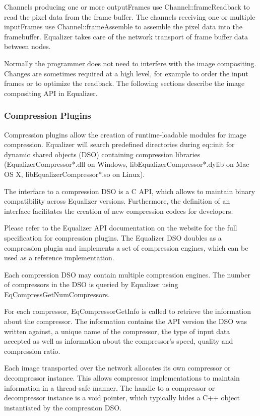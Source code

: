 \documentclass[10pt,a4]{scrartcl}
\begin{document}
Channels producing one or more \textsf{outputFrame}s use
\textsf{Channel::frame\-Read\-back} to read the pixel data from the frame
buffer. The channels receiving one or multiple \textsf{inputFrame}s use
\textsf{Channel::frameAssemb\-le} to assemble the pixel data into the
framebuffer. Equalizer takes care of the network transport of frame buffer data
between nodes.

Normally the programmer does not need to interfere with the image
compositing. Changes are sometimes required at a high level, for example
to order the input frames or to optimize the readback. The following
sections describe the image compositing API in Equalizer.

\subsubsection{Compression Plugins}

Compression plugins allow the creation of runtime-loadable modules for
image compression. Equalizer will search predefined directories during
\textsf{eq::init} for dynamic shared objects (DSO) containing compression
libraries (EqualizerCompressor*.dll on Windows, libEqualizerCompressor*.dylib
on Mac OS X, libEqualizerCompressor*.so on Linux).

The interface to a compression DSO is a C API, which allows to maintain
binary compatibility across Equalizer versions. Furthermore, the
definition of an interface facilitates the creation of new compression
codecs for developers. 

Please refer to the Equalizer API documentation on the website for the
full specification for compression plugins. The Equalizer DSO doubles as
a compression plugin and implements a set of compression engines, which
can be used as a reference implementation.

Each compression DSO may contain multiple compression engines. The
number of compressors in the DSO is queried by Equalizer using
\textsf{EqCompressGetNumCompressors}. 

For each compressor, \textsf{EqCompressorGetInfo} is called to retrieve
the information about the compressor. The information contains the API
version the DSO was written against, a unique name of the compressor,
the type of input data accepted as well as information about the
compressor's speed, quality and compression ratio.

Each image transported over the network allocates its own compressor or
decompressor instance. This allows compressor implementations to
maintain information in a thread-safe manner. The handle to a compressor
or decompressor instance is a void pointer, which typically hides a C++
object instantiated by the compression DSO.
\end{document}
